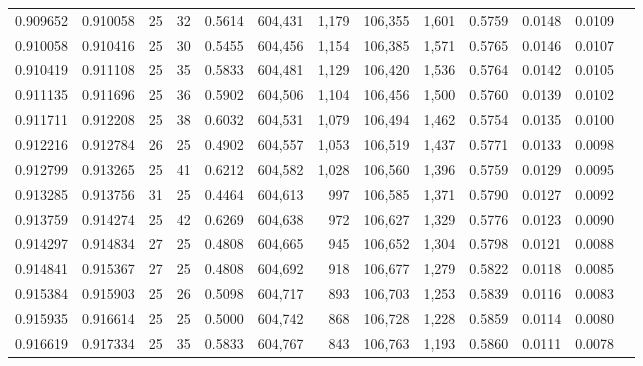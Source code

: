 \begin{tabular}{rrrrrrrrrrrrr}
0.909652 & 0.910058 &    25 &  32 &                                     0.5614 & 604,431 &   1,179 & 106,355 &   1,601 & 0.5759 & 0.0148 & 0.0109 \\
0.910058 & 0.910416 &    25 &  30 &                                     0.5455 & 604,456 &   1,154 & 106,385 &   1,571 & 0.5765 & 0.0146 & 0.0107 \\
0.910419 & 0.911108 &    25 &  35 &                                     0.5833 & 604,481 &   1,129 & 106,420 &   1,536 & 0.5764 & 0.0142 & 0.0105 \\
0.911135 & 0.911696 &    25 &  36 &                                     0.5902 & 604,506 &   1,104 & 106,456 &   1,500 & 0.5760 & 0.0139 & 0.0102 \\
0.911711 & 0.912208 &    25 &  38 &                                     0.6032 & 604,531 &   1,079 & 106,494 &   1,462 & 0.5754 & 0.0135 & 0.0100 \\
0.912216 & 0.912784 &    26 &  25 &                                     0.4902 & 604,557 &   1,053 & 106,519 &   1,437 & 0.5771 & 0.0133 & 0.0098 \\
0.912799 & 0.913265 &    25 &  41 &                                     0.6212 & 604,582 &   1,028 & 106,560 &   1,396 & 0.5759 & 0.0129 & 0.0095 \\
0.913285 & 0.913756 &    31 &  25 &                                     0.4464 & 604,613 &     997 & 106,585 &   1,371 & 0.5790 & 0.0127 & 0.0092 \\
0.913759 & 0.914274 &    25 &  42 &                                     0.6269 & 604,638 &     972 & 106,627 &   1,329 & 0.5776 & 0.0123 & 0.0090 \\
0.914297 & 0.914834 &    27 &  25 &                                     0.4808 & 604,665 &     945 & 106,652 &   1,304 & 0.5798 & 0.0121 & 0.0088 \\
0.914841 & 0.915367 &    27 &  25 &                                     0.4808 & 604,692 &     918 & 106,677 &   1,279 & 0.5822 & 0.0118 & 0.0085 \\
0.915384 & 0.915903 &    25 &  26 &                                     0.5098 & 604,717 &     893 & 106,703 &   1,253 & 0.5839 & 0.0116 & 0.0083 \\
0.915935 & 0.916614 &    25 &  25 &                                     0.5000 & 604,742 &     868 & 106,728 &   1,228 & 0.5859 & 0.0114 & 0.0080 \\
0.916619 & 0.917334 &    25 &  35 &                                     0.5833 & 604,767 &     843 & 106,763 &   1,193 & 0.5860 & 0.0111 & 0.0078 \\

\end{tabular}
